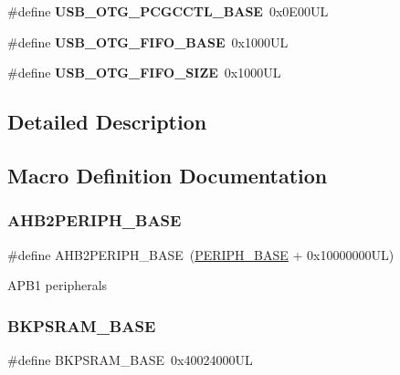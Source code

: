 \begin{DoxyCompactItemize}
\#define {\bfseries U\+S\+B\+\_\+\+O\+T\+G\+\_\+\+P\+C\+G\+C\+C\+T\+L\+\_\+\+B\+A\+SE}~0x0\+E00\+UL
\item 
\mbox{\label{group___peripheral__memory__map_gace340350802904868673f0e839c4fa04}} 
\#define {\bfseries U\+S\+B\+\_\+\+O\+T\+G\+\_\+\+F\+I\+F\+O\+\_\+\+B\+A\+SE}~0x1000\+UL
\item 
\mbox{\label{group___peripheral__memory__map_ga8781c4b2406c740d9fe540737a6a0188}} 
\#define {\bfseries U\+S\+B\+\_\+\+O\+T\+G\+\_\+\+F\+I\+F\+O\+\_\+\+S\+I\+ZE}~0x1000\+UL
\end{DoxyCompactItemize}


\subsection{Detailed Description}


\subsection{Macro Definition Documentation}
\mbox{\label{group___peripheral__memory__map_gaeedaa71d22a1948492365e2cd26cfd46}} 
\subsubsection{\texorpdfstring{AHB2PERIPH\_BASE}{AHB2PERIPH\_BASE}}
{\footnotesize\ttfamily \#define A\+H\+B2\+P\+E\+R\+I\+P\+H\+\_\+\+B\+A\+SE~(\mbox{\hyperlink{group___peripheral__memory__map_ga9171f49478fa86d932f89e78e73b88b0}{P\+E\+R\+I\+P\+H\+\_\+\+B\+A\+SE}} + 0x10000000\+U\+L)}

A\+P\+B1 peripherals \mbox{\label{group___peripheral__memory__map_ga52e57051bdf8909222b36e5408a48f32}} 
\subsubsection{\texorpdfstring{BKPSRAM\_BASE}{BKPSRAM\_BASE}}
{\footnotesize\ttfamily \#define B\+K\+P\+S\+R\+A\+M\+\_\+\+B\+A\+SE~0x40024000\+UL}


